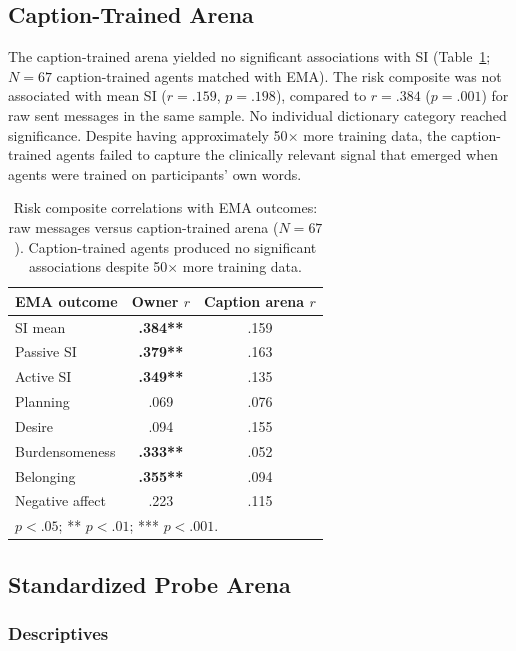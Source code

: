 \documentclass[review,12pt,authoryear]{elsarticle}
\begin{document}
\subsection{Caption-Trained Arena}

The caption-trained arena yielded no significant associations with SI (Table~\ref{tab:caption_arena}; $N = 67$ caption-trained agents matched with EMA). The risk composite was not associated with mean SI ($r = .159$, $p = .198$), compared to $r = .384$ ($p = .001$) for raw sent messages in the same sample. No individual dictionary category reached significance. Despite having approximately 50$\times$ more training data, the caption-trained agents failed to capture the clinically relevant signal that emerged when agents were trained on participants' own words.

\begin{table}[H]
\centering
\caption{Risk composite correlations with EMA outcomes: raw messages versus caption-trained arena ($N = 67$). Caption-trained agents produced no significant associations despite 50$\times$ more training data.}
\label{tab:caption_arena}
\small
\begin{tabular}{lcc}
\toprule
EMA outcome & Owner $r$ & Caption arena $r$ \\
\midrule
SI mean & \textbf{.384**} & .159 \\
Passive SI & \textbf{.379**} & .163 \\
Active SI & \textbf{.349**} & .135 \\
Planning & .069 & .076 \\
Desire & .094 & .155 \\
Burdensomeness & \textbf{.333**} & .052 \\
Belonging & \textbf{.355**} & .094 \\
Negative affect & .223 & .115 \\
\bottomrule
\multicolumn{3}{l}{\footnotesize * $p < .05$; ** $p < .01$; *** $p < .001$.}
\end{tabular}
\end{table}

\subsection{Standardized Probe Arena}

\subsubsection{Descriptives}
\end{document}
